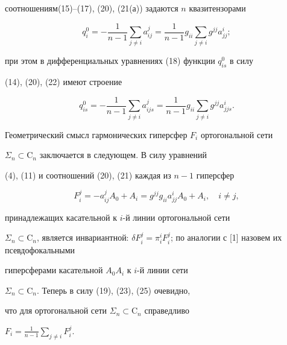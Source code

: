 соотношениям\linebreak (15)--(17), (20), (21(а)) задаются $n$ квазитензорами 


\begin{equation} 


q^0_i=-\frac{1}{n-1}\sum_{j\ne i}a^j_{ij}=\frac{1}{n-1} 


g_{ii}\sum_{j\ne i}g^{jj}a^i_{jj}; 


\end{equation} 


при этом в дифференциальных уравнениях (18) функции $q^0_{is}$ в силу 


(14), (20), (22) имеют строение 


\begin{equation} 


q^0_{is}=-\frac{1}{n-1}\sum_{j\ne i}a^j_{ijs}= 


\frac{1}{n-1}g_{ii}\sum_{j\ne i}g^{jj}a^i_{jjs}. 


\end{equation} 


 


Геометрический смысл гармонических гиперсфер $F_i$ ортогональной сети 


$\Sigma_n\subset\mathrm C_n$ заключается в следующем. В силу уравнений 


(4), (11) и соотношений (20), (21) каждая из $n-1$ гиперсфер 


\begin{equation} 


F^j_i=-a^j_{ij}A_0+A_i=g^{jj}g_{ii}a^i_{jj}A_0+A_i,\quad i\ne j, 


\end{equation} 


принадлежащих касательной к $i$-й линии ортогональной сети 


$\Sigma_n\subset\mathrm C_n$, является инвариантной: $\delta 


F^j_i=\pi^i_i F^j_i$; по аналогии с [1] назовем их псевдофокальными 


гиперсферами касательной $A_0A_i$ к $i$-й линии сети 


$\Sigma_n\subset\mathrm C_n$. Теперь в силу (19), (23), (25) очевидно, 


что для ортогональной сети $\Sigma_n\subset\mathrm C_n$ справедливо 


$F_i=\frac{1}{n-1}\sum\limits_{j\ne i}F^j_i$. 


 


